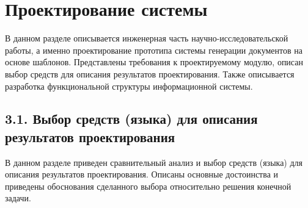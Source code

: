 \chapter{Проектирование системы}
\label{chapter3}

В данном разделе описывается инженерная часть научно-исследовательской работы, а именно проектирование прототипа системы генерации документов на основе шаблонов. Представлены требования к проектируемому модулю, описан выбор средств для  описания результатов проектирования. Также описывается разработка функциональной структуры информационной системы.




\section{3.1. Выбор средств (языка) для описания результатов проектирования}


В данном разделе приведен сравнительный анализ и выбор средств (языка) для описания результатов проектирования. Описаны основные достоинства и приведены обоснования сделанного выбора относительно решения конечной задачи.


